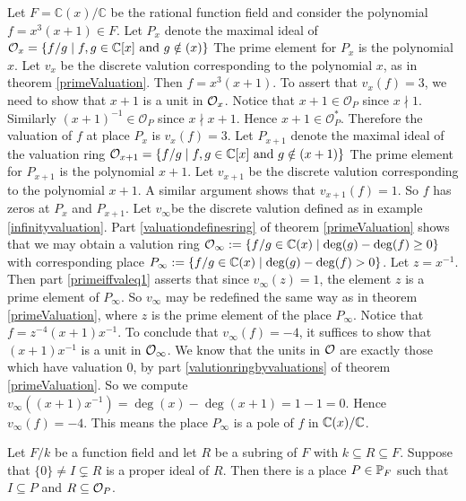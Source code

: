 \begin{example} \label{firstencounterwithpolesanddivisors}
	Let $F = \mathbb{C}(x)/\mathbb{C}$ be the rational function field
	and consider the polynomial $f = x^3(x+1) \in F$. Let $P_{x}$ denote
	the maximal ideal of 
	$\mathcal{O}_x = \lbrace f/g \mid f,g \in \mathbb{C}[x] \text{ and } g \notin (x) \rbrace $
	The prime element for $P_x$ is the polynomial $x$. Let $v_x$ be 
	the discrete valution corresponding to the polynomial $x$, 
	as in theorem \ref{primeValuation}. 
	Then $f = x^3(x+1)$. To assert that $v_x(f) = 3$, 
	we need to show that $x+1$ is a unit in $\mathcal{O}_x$.
	Notice that $x + 1 \in  \mathcal{O}_P$ 
	since $x \nmid 1$. Similarly $(x+1)^{-1} \in \mathcal{O}_P$ 
	since $x \nmid x + 1 $. Hence $x+1 \in \mathcal{O}_P^*$. 
	Therefore the valuation of $f$ at place $P_x$ is $v_x(f)= 3$. 
	Let $P_{x+1}$ denote the maximal ideal of the valuation ring
	$\mathcal{O}_{x+1} = \lbrace f/g \mid f,g \in \mathbb{C}[x] \text{ and } g \notin (x+1) \rbrace $
	The prime element for $P_{x+1}$ is the polynomial $x+1$. Let $v_{x+1}$ be 
	the discrete valution corresponding to the polynomial $x+1$. 
	A similar argument shows that $v_{x+1}(f) = 1$. So $f$ 
	has zeros at $P_x$ and $P_{x+1}$. 
	Let $v_\infty$be the discrete valution defined as in example \ref{infinityvaluation}. 
	Part \eqref{valuationdefinesring} of theorem \ref{primeValuation}
	shows that we may obtain a valution ring 
	$
	\mathcal{O}_\infty := \lbrace f/g \in \mathbb{C}(x) \mid \deg (g) - \deg (f) \geq 0 \rbrace
	$ 
	with corresponding place 
	$
	P_\infty := \lbrace f/g \in \mathbb{C}(x) \mid \deg (g) - \deg (f) > 0 \rbrace
	$.
	Let $z = x^{-1}$. Then part \eqref{primeiffvaleq1} asserts that 
	since $v_\infty(z)=1$, the element $z$ is a prime element of $P_\infty$. 
	So $v_\infty$ may be redefined the same way as in theorem \ref{primeValuation}, 
	where $z$ is the prime element of the place $P_\infty$.
	Notice that $f = z^{-4}(x+1)x^{-1}$. To conclude that $v_\infty (f) = -4$,
	it suffices to show that $(x+1)x^{-1}$ is a unit in $\mathcal{O}_\infty$. 
	We know that the units in $\mathcal{O}$ are exactly those which have valuation $0$, 
	by part \eqref{valutionringbyvaluations} of theorem \ref{primeValuation}.
	So we compute $v_\infty((x+1)x^{-1}) = \deg(x) - \deg(x+1) = 1-1=0$. 
	Hence $v_\infty(f) = -4$. This means the place $P_\infty$ is a pole 
	of $f$ in $\mathbb{C}(x)/\mathbb{C}$. 
\end{example}

\begin{theorem} \label{subringIsValuation}
	Let $F/k$ be a function field and let $R$ be a subring 
	of $F$ with $k \subseteq R \subseteq F $. Suppose 
	that $\lbrace 0 \rbrace \neq I \subsetneq R $ is a 
	proper ideal of $R$. Then there is a place $P \in \mathbb{P}_F$ 
	such that $I \subseteq P $ and $ R \subseteq \mathcal{O}_P$.  
\end{theorem}

